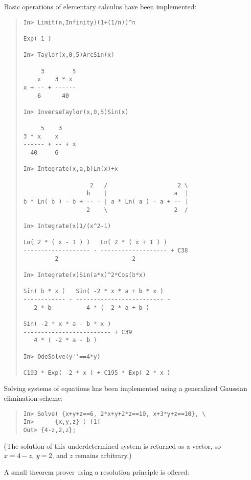 \documentclass{llncs}
\begin{document}
Basic operations of elementary calculus have been implemented:


\begin{quote}\small\begin{verbatim}
In> Limit(n,Infinity)(1+(1/n))^n

Exp( 1 )

In> Taylor(x,0,5)ArcSin(x)

     3        5
    x    3 * x 
x + -- + ------
    6      40  

In> InverseTaylor(x,0,5)Sin(x)

     5    3    
3 * x    x     
------ + -- + x
  40     6     

In> Integrate(x,a,b)Ln(x)+x

                   2   /                    2 \
                  b    |                   a  |
b * Ln( b ) - b + -- - | a * Ln( a ) - a + -- |
                  2    \                   2  /

In> Integrate(x)1/(x^2-1)

Ln( 2 * ( x - 1 ) )   Ln( 2 * ( x + 1 ) )      
------------------- - ------------------- + C38
         2                     2               

In> Integrate(x)Sin(a*x)^2*Cos(b*x)

Sin( b * x )   Sin( -2 * x * a + b * x )   
------------ - ------------------------- - 
   2 * b          4 * ( -2 * a + b )       

Sin( -2 * x * a - b * x )      
------------------------- + C39
   4 * ( -2 * a - b )          

In> OdeSolve(y''==4*y)

C193 * Exp( -2 * x ) + C195 * Exp( 2 * x )
\end{verbatim}\end{quote}


Solving systems of equations has been implemented using a generalized Gaussian
elimination scheme:


\begin{quote}\small\begin{verbatim}
In> Solve( {x+y+z==6, 2*x+y+2*z==10, x+3*y+z==10}, \
In>      {x,y,z} ) [1]
Out> {4-z,2,z};
\end{verbatim}\end{quote}
(The solution of this underdetermined system is returned as a vector, so $x = 4 - z$, $y = 2$, and $z$ remains arbitrary.)


A small theorem prover \cite{B86} using a resolution principle is offered:
\end{document}
